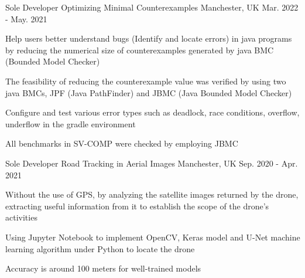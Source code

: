 \begin{cventries}

  \cventry
    {Sole Developer} %
    {Optimizing Minimal Counterexamples} %
    {Manchester, UK} %
    {Mar. 2022 - May. 2021} %
    {
      \begin{cvitems} %
        \item {Help users better understand bugs (Identify and locate errors) in java programs by reducing the numerical size of counterexamples generated by java BMC (Bounded Model Checker)}
        \item {The feasibility of reducing the counterexample value was verified by using two java BMCs, JPF (Java PathFinder) and JBMC (Java Bounded Model Checker)}
        \item {Configure and test various error types such as deadlock, race conditions, overflow, underflow in the gradle environment}
        \item {All benchmarks in SV-COMP were checked by employing JBMC}
      \end{cvitems}
    }

  \cventry
    {Sole Developer} %
    {Road Tracking in Aerial Images} %
    {Manchester, UK} %
    {Sep. 2020 - Apr. 2021} %
    {
      \begin{cvitems} %
        \item {Without the use of GPS, by analyzing the satellite images returned by the drone, extracting useful information from it to establish the scope of the drone's activities}
        \item {Using Jupyter Notebook to implement OpenCV, Keras model and U-Net machine learning algorithm under Python to locate the drone}
        \item {Accuracy is around 100 meters for well-trained models}
      \end{cvitems}
    }


\end{cventries}
